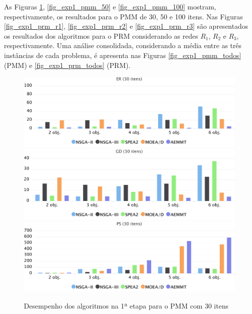 As Figuras \ref{fig_exp1_pmm_30}, \ref{fig_exp1_pmm_50} e \ref{fig_exp1_pmm_100} mostram, respectivamente, os resultados para o PMM de 30, 50 e 100 itens. Nas Figuras \ref{fig_exp1_prm_r1}, \ref{fig_exp1_prm_r2} e \ref{fig_exp1_prm_r3} são apresentados os resultados dos algoritmos para o PRM considerando as redes $R_1$, $R_2$ e $R_3$, respectivamente. Uma análise consolidada, considerando a média entre as três instâncias de cada problema, é apresenta nas Figuras \ref{fig_exp1_pmm_todos} (PMM) e \ref{fig_exp1_prm_todos} (PRM).

\begin{figure}[!htbp]
	\includegraphics[width=1\textwidth]{cap_experimentos/figs/etapa1/er-mkp-30}
	\includegraphics[width=1\textwidth]{cap_experimentos/figs/etapa1/gd-mkp-30}
	\includegraphics[width=1\textwidth]{cap_experimentos/figs/etapa1/ps-mkp-30}
	\caption{\label{fig_exp1_pmm_30}Desempenho dos algoritmos na 1ª etapa para o PMM com 30 itens}
\end{figure}

